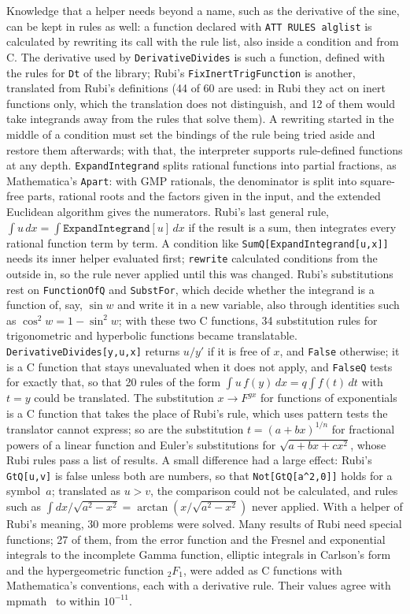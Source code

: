 \documentclass[11pt,a4paper]{article}
\begin{document}
Knowledge that a helper needs beyond a name, such as the derivative of the
sine, can be kept in rules as well: a function declared with
\texttt{ATT RULES alglist} is calculated by rewriting its call with the
rule list, also inside a condition and from C. The derivative used by
\texttt{DerivativeDivides} is such a function, defined with the rules for
\texttt{Dt} of the library; Rubi's \texttt{FixInertTrigFunction} is another,
translated from Rubi's definitions (44 of 60 are used: in Rubi they act on
inert functions only, which the translation does not distinguish, and 12
of them would take integrands away from the rules that solve them). A
rewriting started in the middle of a condition must set the bindings of
the rule being tried aside and restore them afterwards; with that, the
interpreter supports rule-defined functions at any depth. \texttt{ExpandIntegrand} splits rational functions into
partial fractions, as Mathematica's \texttt{Apart}: with GMP rationals, the
denominator is split into square-free parts, rational roots and the factors
given in the input, and the extended Euclidean algorithm gives the
numerators. Rubi's last general rule, $\int u\,dx=\int
\texttt{ExpandIntegrand}[u]\,dx$ if the result is a sum, then integrates
every rational function term by term. A condition like
\texttt{SumQ[ExpandIntegrand[u,x]]} needs its inner helper evaluated
first; \texttt{rewrite} calculated conditions from the outside in, so the
rule never applied until this was changed. Rubi's substitutions rest on
\texttt{FunctionOfQ} and \texttt{SubstFor}, which decide whether the
integrand is a function of, say, $\sin w$ and write it in a new variable,
also through identities such as $\cos^2w=1-\sin^2w$; with these two C
functions, 34 substitution rules for trigonometric and hyperbolic functions
became translatable. \texttt{DerivativeDivides[y,u,x]} returns $u/y'$ if it
is free of $x$, and \texttt{False} otherwise; it is a C function that stays
unevaluated when it does not apply, and \texttt{FalseQ} tests for exactly
that, so that 20 rules of the form $\int u\,f(y)\,dx=q\int f(t)\,dt$ with
$t=y$ could be translated. The substitution $x\to F^{gx}$ for functions of
exponentials is a C function that takes the place of Rubi's rule, which
uses pattern tests the translator cannot express; so are the substitution
$t=(a+bx)^{1/n}$ for fractional powers of a linear function and Euler's
substitutions for $\sqrt{a+bx+cx^2}$, whose Rubi rules pass a list of
results. A small difference had a large effect: Rubi's \texttt{GtQ[u,v]} is
false unless both are numbers, so that \texttt{Not[GtQ[a\^{}2,0]]} holds for
a symbol~$a$; translated as $u>v$, the comparison could not be calculated,
and rules such as $\int dx/\sqrt{a^2-x^2}=\arctan(x/\sqrt{a^2-x^2})$ never
applied. With a helper of Rubi's meaning, 30 more problems were solved. Many results of Rubi need special functions; 27 of them,
from the error function and the Fresnel and exponential integrals to the
incomplete Gamma function, elliptic integrals in Carlson's
form~\cite{carlson1995} and the hypergeometric function ${}_2F_1$, were
added as C functions with Mathematica's conventions, each with a derivative
rule. Their values agree with mpmath~\cite{mpmath} to within $10^{-11}$.
\end{document}
